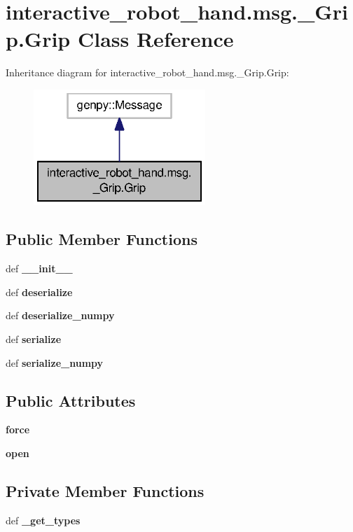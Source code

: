 \section{interactive\-\_\-robot\-\_\-hand.\-msg.\-\_\-\-Grip.\-Grip Class Reference}
\label{classinteractive__robot__hand_1_1msg_1_1__Grip_1_1Grip}


Inheritance diagram for interactive\-\_\-robot\-\_\-hand.\-msg.\-\_\-\-Grip.\-Grip\-:
\nopagebreak
\begin{figure}[H]
\begin{center}
\leavevmode
\includegraphics[width=184pt]{classinteractive__robot__hand_1_1msg_1_1__Grip_1_1Grip__inherit__graph}
\end{center}
\end{figure}
\subsection*{Public Member Functions}
\begin{DoxyCompactItemize}
\item 
def {\bf \-\_\-\-\_\-init\-\_\-\-\_\-}
\item 
def {\bf deserialize}
\item 
def {\bf deserialize\-\_\-numpy}
\item 
def {\bf serialize}
\item 
def {\bf serialize\-\_\-numpy}
\end{DoxyCompactItemize}
\subsection*{Public Attributes}
\begin{DoxyCompactItemize}
\item 
{\bf force}
\item 
{\bf open}
\end{DoxyCompactItemize}
\subsection*{Private Member Functions}
\begin{DoxyCompactItemize}
\item 
def {\bf \-\_\-get\-\_\-types}
\end{DoxyCompactItemize}
